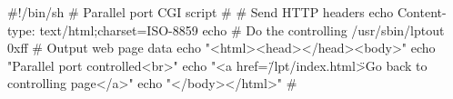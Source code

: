 #!/bin/sh
# Parallel port CGI script
#
# Send HTTP headers
echo Content-type: text/html;charset=ISO-8859
echo
# Do the controlling
/usr/sbin/lptout 0xff
# Output web page data
echo "<html><head></head><body>"
echo "Parallel port controlled<br>"
echo "<a href=\"/lpt/index.html\">Go back to controlling page</a>"
echo "</body></html>"
#